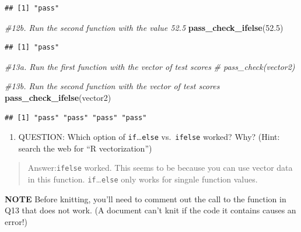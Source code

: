 \documentclass[
]{article}
\newenvironment{Shaded}{\begin{snugshade}}{\end{snugshade}}
\newcommand{\CommentTok}[1]{\textcolor[rgb]{0.56,0.35,0.01}{\textit{#1}}}
\newcommand{\FloatTok}[1]{\textcolor[rgb]{0.00,0.00,0.81}{#1}}
\newcommand{\FunctionTok}[1]{\textcolor[rgb]{0.13,0.29,0.53}{\textbf{#1}}}
\newcommand{\NormalTok}[1]{#1}
\providecommand{\tightlist}{%
  \setlength{\itemsep}{0pt}\setlength{\parskip}{0pt}}
\begin{document}
\begin{verbatim}
## [1] "pass"
\end{verbatim}

\begin{Shaded}
\begin{Highlighting}[]
\CommentTok{\#12b. Run the second function with the value 52.5}
\FunctionTok{pass\_check\_ifelse}\NormalTok{(}\FloatTok{52.5}\NormalTok{)}
\end{Highlighting}
\end{Shaded}

\begin{verbatim}
## [1] "pass"
\end{verbatim}

\begin{Shaded}
\begin{Highlighting}[]
\CommentTok{\#13a. Run the first function with the vector of test scores}
\CommentTok{\# pass\_check(vector2)}

\CommentTok{\#13b. Run the second function with the vector of test scores}
\FunctionTok{pass\_check\_ifelse}\NormalTok{(vector2)}
\end{Highlighting}
\end{Shaded}

\begin{verbatim}
## [1] "pass" "pass" "pass" "pass"
\end{verbatim}

\begin{enumerate}
\def\labelenumi{\arabic{enumi}.}
\setcounter{enumi}{13}
\tightlist
\item
  QUESTION: Which option of \texttt{if}\ldots{}\texttt{else}
  vs.~\texttt{ifelse} worked? Why? (Hint: search the web for ``R
  vectorization'')
\end{enumerate}

\begin{quote}
Answer:\texttt{ifelse} worked. This seems to be because you can use
vector data in this function. \texttt{if}\ldots{}\texttt{else} only
works for singnle function values.
\end{quote}

\textbf{NOTE} Before knitting, you'll need to comment out the call to
the function in Q13 that does not work. (A document can't knit if the
code it contains causes an error!)
\end{document}
